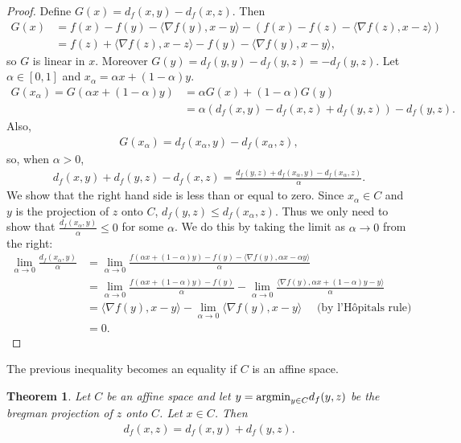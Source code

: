 \documentclass{article}
\newtheorem{theorem}{Theorem}
\newcommand{\argmin}{\mbox{\textup{argmin}}}
\begin{document}
\begin{proof}
Define $G(x) = d_f(x,y)-d_f(x,z)$.  Then
\begin{align*}
G(x) &= f(x)-f(y) - \langle \nabla f(y),x-y\rangle - \left(
  f(x)-f(z)-\langle \nabla f(z),x-z \rangle \right)\\
&= f(z) + \langle \nabla f(z),x-z \rangle - f(y) - \langle \nabla
f(y), x-y \rangle,
\end{align*}
so $G$ is linear in $x$.  Moreover $G(y)= d_f(y,y) - d_f(y,z) =
-d_f(y,z)$. Let $\alpha \in [0,1]$ and $x_\alpha = \alpha x + (1-\alpha)y$.   
\begin{align*}
G(x_\alpha) = G(\alpha x + (1-\alpha) y) &= \alpha G(x) +
(1-\alpha)G(y) \\
&= \alpha (d_f(x,y)-d_f(x,z) +d_f(y,z)) -d_f(y,z).
\end{align*}
Also,
\begin{align*}
G(x_\alpha) =d_f(x_\alpha,y) - d_f(x_\alpha,z),
\end{align*}
so, when $\alpha>0$,
\begin{align*}
d_f(x,y) +d_f(y,z) - d_f(x,z) = \frac{d_f(y,z)+ d_f(x_\alpha,y) -
  d_f(x_\alpha,z)}{\alpha}.
\end{align*}
We show that the right hand side is less than or equal to zero.  Since
$x_\alpha \in C$ and $y$ is the projection of $z$ onto $C$, $d_f(y,z)
\leq d_f(x_\alpha,z)$. Thus we only need to show that
$\frac{d_f(x_\alpha,y)}{\alpha} \leq 0$ for some $\alpha$.  We do this
by taking the limit as $\alpha\rightarrow 0$ from the right:  
\begin{align*}
\lim_{\alpha\rightarrow 0} \frac{d_f(x_\alpha,y)}{\alpha} &=
\lim_{\alpha\rightarrow 0} \frac{f(\alpha x+ (1-\alpha)y) - f(y)
  -\langle \nabla f(y),\alpha x-\alpha y\rangle}{\alpha} \\
&= \lim_{\alpha\rightarrow 0} \frac{f(\alpha x + (1-\alpha)y) -
  f(y)}{\alpha} - \lim_{\alpha\rightarrow 0} \frac{\langle \nabla
  f(y),\alpha x + (1-\alpha)y -y \rangle}{\alpha}\\
&= \langle \nabla f(y),x-y \rangle - \lim_{\alpha\rightarrow 0}
\langle \nabla f(y),x-y \rangle \quad \mbox{ (by
  l'H\^{o}pitals rule) } \\
&= 0. 
\end{align*}
\end{proof}
The previous inequality becomes an equality if $C$ is an affine space.
\begin{theorem} Let $C$ be an affine space and let $y=\argmin_{y\in C}
  d_f(y,z)$ be the bregman projection of $z$ onto $C$.  Let $x\in C$.
  Then
\begin{align*}
d_f(x,z) = d_f(x,y) + d_f(y,z).
\end{align*}
\end{theorem}
\end{document}
